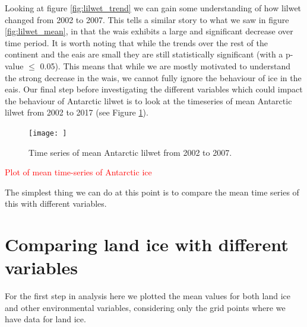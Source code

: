 \documentclass[../main.tex]{subfiles}
\begin{document}
Looking at figure \ref{fig:lilwet_trend} we can gain some understanding of how \gls{lilwet} changed from 2002 to 2007. This tells a similar story to what we saw in figure \ref{fig:lilwet_mean}, in that the \gls{wais} exhibits a large and significant decrease over time period. It is worth noting that while the trends over the rest of the continent and the \gls{eais} are small they are still statistically significant (with a p-value $\leq$ 0.05). This means that while we are mostly motivated to understand the strong decrease in the \gls{wais}, we cannot fully ignore the behaviour of ice in the \gls{eais}. Our final step before investigating the different variables which could impact the behaviour of Antarctic \gls{lilwet} is to look at the timeseries of mean Antarctic \gls{lilwet} from 2002 to 2017 (see Figure \ref{fig:lilwet_timeseries}).

\begin{figure}[!hbt]
    \centering
    \texttt{[image: ]}
    \caption{Time series of mean Antarctic \gls{lilwet} from 2002 to 2007.}
    \label{fig:lilwet_timeseries}
\end{figure}

\textcolor{red}{Plot of mean time-series of Antarctic ice}

The simplest thing we can do at this point is to compare the mean time series of this with different variables.

\section{Comparing land ice with different variables}
For the first step in analysis here we plotted the mean values for both land ice and other environmental variables, considering only the grid points where we have data for land ice.
\end{document}
